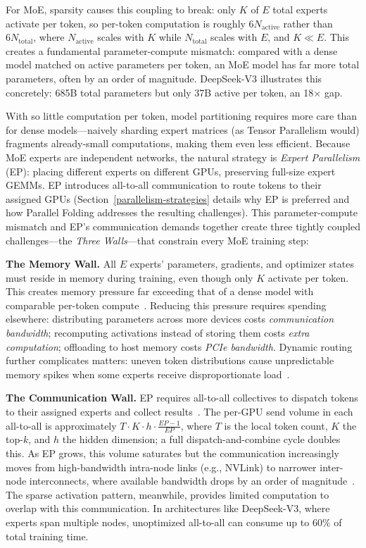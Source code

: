 \documentclass[10pt,logo,copyright]{nvidiatechreport}
\begin{document}
For MoE, sparsity causes this coupling to break: only $K$ of $E$ total experts activate per token, so per-token computation is roughly $6 N_{\text{active}}$ rather than $6 N_{\text{total}}$, where $N_{\text{active}}$ scales with $K$ while $N_{\text{total}}$ scales with $E$, and $K \ll E$. This creates a fundamental parameter-compute mismatch: compared with a dense model matched on active parameters per token, an MoE model has far more total parameters, often by an order of magnitude. DeepSeek-V3 illustrates this concretely: 685B total parameters but only 37B active per token, an 18$\times$ gap.

With so little computation per token, model partitioning requires more care than for dense models---naively sharding expert matrices (as Tensor Parallelism would) fragments already-small computations, making them even less efficient. Because MoE experts are independent networks, the natural strategy is \emph{Expert Parallelism} (EP): placing different experts on different GPUs, preserving full-size expert GEMMs. EP introduces all-to-all communication to route tokens to their assigned GPUs (Section~\ref{parallelism-strategies} details why EP is preferred and how Parallel Folding addresses the resulting challenges). This parameter-compute mismatch and EP's communication demands together create three tightly coupled challenges---the \emph{Three Walls}---that constrain every MoE training step:

\textbf{The Memory Wall.} All $E$ experts' parameters, gradients, and optimizer states must reside in memory during training, even though only $K$ activate per token. This creates memory pressure far exceeding that of a dense model with comparable per-token compute~\cite{fedus2022switchtransformersscalingtrillion,Cai_2025}. Reducing this pressure requires spending elsewhere: distributing parameters across more devices costs \emph{communication bandwidth}; recomputing activations instead of storing them costs \emph{extra computation}; offloading to host memory costs \emph{PCIe bandwidth}. Dynamic routing further complicates matters: uneven token distributions cause unpredictable memory spikes when some experts receive disproportionate load~\cite{lepikhin2020gshard,wang2024auxiliarylossfreeloadbalancingstrategy}.

\textbf{The Communication Wall.} EP requires all-to-all collectives to dispatch tokens to their assigned experts and collect results~\cite{lepikhin2020gshard}. The per-GPU send volume in each all-to-all is approximately $T \cdot K \cdot h \cdot \frac{EP-1}{EP}$, where $T$ is the local token count, $K$ the top-$k$, and $h$ the hidden dimension; a full dispatch-and-combine cycle doubles this. As EP grows, this volume saturates but the communication increasingly moves from high-bandwidth intra-node links (e.g., NVLink) to narrower inter-node interconnects, where available bandwidth drops by an order of magnitude~\cite{deepep2025}. The sparse activation pattern, meanwhile, provides limited computation to overlap with this communication. In architectures like DeepSeek-V3, where experts span multiple nodes, unoptimized all-to-all can consume up to 60\% of total training time.
\end{document}
